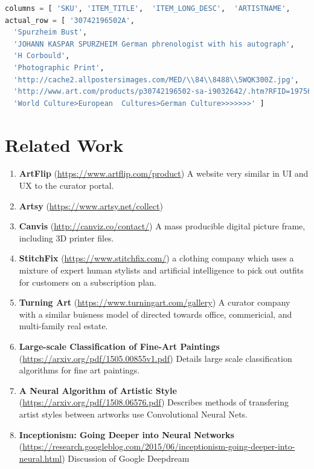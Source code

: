 \documentclass[fontsize=12pt]{scrartcl} %
\numberwithin{equation}{section} %
\numberwithin{figure}{section} %
\numberwithin{table}{section} %
\begin{document}
\begin{lstlisting}[language=Python]
columns = [ 'SKU', 'ITEM_TITLE',  'ITEM_LONG_DESC',  'ARTISTNAME',    'ITEM_TYPE',  'IMAGE_URL',  'PRODUCT_URL', 'PRODUCT_TAXONOMY' ]
actual_row = [ '30742196502A',
  'Spurzheim Bust',
  'JOHANN KASPAR SPURZHEIM German phrenologist with his autograph',
  'H Corbould',
  'Photographic Print',
  'http://cache2.allpostersimages.com/MED/\\84\\8488\\5WQK300Z.jpg',
  'http://www.art.com/products/p30742196502-sa-i9032642/.htm?RFID=197560',
  'World Culture>European  Cultures>German Culture>>>>>>>' ]
\end{lstlisting}

\section{Related Work}
\begin{enumerate}
    \item\textbf{ArtFlip} (\url{https://www.artflip.com/product}) A website very similar in UI and UX to the curator portal.
    \item\textbf{Artsy}  (\url{https://www.artsy.net/collect})
    \item\textbf{Canvis} (\url{http://canviz.co/contact/})  A mass producible digital picture frame, including 3D printer files.
    \item\textbf{StitchFix} (\url{https://www.stitchfix.com/})  a clothing company which uses a mixture of expert human stylists and artificial intelligence to pick out outfits for customers on a subscription plan.
    \item\textbf{Turning Art} (\url{https://www.turningart.com/gallery}) A curator company with a similar buisness model of directed towards office, commericial, and multi-family real estate.
    \item\textbf{Large-scale Classification of Fine-Art Paintings} (\url{https://arxiv.org/pdf/1505.00855v1.pdf}) Details large scale classification algorithms for fine art paintings.
    \item\textbf{A Neural Algorithm of Artistic Style} (\url{https://arxiv.org/pdf/1508.06576.pdf}) Describes methods of transfering artist styles between artworks use Convolutional Neural Nets.
    \item\textbf{Inceptionism: Going Deeper into Neural Networks} (\url{https://research.googleblog.com/2015/06/inceptionism-going-deeper-into-neural.html}) Discussion of Google Deepdream
\end{enumerate}
\end{document}

